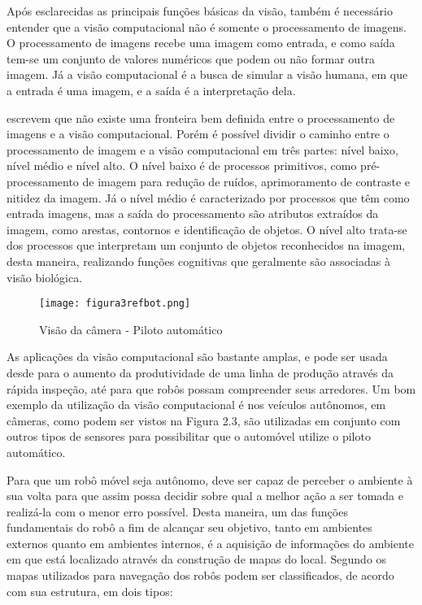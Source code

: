 Após esclarecidas as principais funções básicas da visão, também é necessário entender que a visão computacional não é somente o processamento de imagens. O processamento de imagens recebe uma imagem como entrada, e como saída tem-se um conjunto de valores numéricos que podem ou não formar outra imagem. Já a visão computacional é a busca de simular a visão humana, em que a entrada é uma imagem, e a saída é a interpretação dela. 

\cite{gonzalez} escrevem que não existe uma fronteira bem definida entre o processamento de imagens e a visão computacional. Porém é possível dividir o caminho entre o processamento de imagem e a visão computacional em três partes: nível baixo, nível médio e nível alto. O nível baixo é de processos primitivos, como pré-processamento de imagem para redução de ruídos, aprimoramento de contraste e nitidez da imagem. Já o nível médio é caracterizado por processos que têm como entrada imagens, mas a saída do processamento são atributos extraídos da imagem, como arestas, contornos e identificação de objetos. O nível alto trata-se dos processos que interpretam um conjunto de objetos reconhecidos na imagem, desta maneira, realizando funções cognitivas que geralmente são associadas à visão biológica.

\begin{figure}[h!]												
	\centering												
	\texttt{[image: figura3refbot.png]}			
	\caption{Visão da câmera - Piloto automático}		
	\label{img:denavit}	
\end{figure}

As aplicações da visão computacional são bastante amplas, e pode ser usada desde para o aumento da produtividade de uma linha de produção através da rápida inspeção, até para que robôs possam compreender seus arredores. Um bom exemplo da utilização da visão computacional é nos veículos autônomos, em câmeras, como podem ser vistos na Figura 2.3, são utilizadas em conjunto com outros tipos de sensores para possibilitar que o automóvel utilize o piloto automático. 



Para que um robô móvel seja autônomo, deve ser capaz de perceber o ambiente à sua volta para que assim possa decidir sobre qual a melhor ação a ser tomada e realizá-la com o menor erro possível. Desta maneira, um das funções fundamentais do robô a fim de alcançar seu objetivo, tanto em ambientes externos quanto em ambientes internos, é a aquisição de informações do ambiente em que está localizado através da construção de mapas do local. Segundo \cite{murphy} os mapas utilizados para navegação dos robôs podem ser classificados, de acordo com sua estrutura, em dois tipos:


